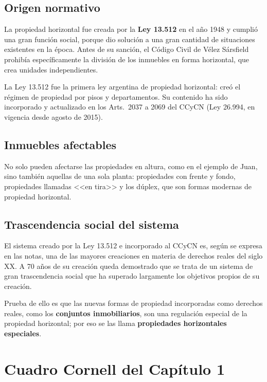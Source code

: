 \documentclass[12pt,oneside]{book}
\begin{document}
\subsection{Origen normativo}

La propiedad horizontal fue creada por la \textbf{Ley 13.512} en el año 1948 y cumplió una gran función social, porque dio solución a una gran cantidad de situaciones existentes en la época. Antes de su sanción, el Código Civil de Vélez Sársfield prohibía específicamente la división de los inmuebles en forma horizontal, que crea unidades independientes.

La Ley 13.512 fue la primera ley argentina de propiedad horizontal: creó el régimen de propiedad por pisos y departamentos. Su contenido ha sido incorporado y actualizado en los Arts.~2037 a 2069 del CCyCN (Ley 26.994, en vigencia desde agosto de 2015).

\subsection{Inmuebles afectables}

No solo pueden afectarse las propiedades en altura, como en el ejemplo de Juan, sino también aquellas de una sola planta: propiedades con frente y fondo, propiedades llamadas <<en tira>> y los dúplex, que son formas modernas de propiedad horizontal.

\subsection{Trascendencia social del sistema}

El sistema creado por la Ley 13.512 e incorporado al CCyCN es, según se expresa en las notas, una de las mayores creaciones en materia de derechos reales del siglo XX. A 70 años de su creación %
queda demostrado que se trata de un sistema de gran trascendencia social que ha superado largamente los objetivos propios de su creación.

Prueba de ello es que las nuevas formas de propiedad incorporadas como derechos reales, como los \textbf{conjuntos inmobiliarios}, son una regulación especial de la propiedad horizontal; por eso se las llama \textbf{propiedades horizontales especiales}.

\section{Cuadro Cornell del Capítulo 1}
\end{document}
